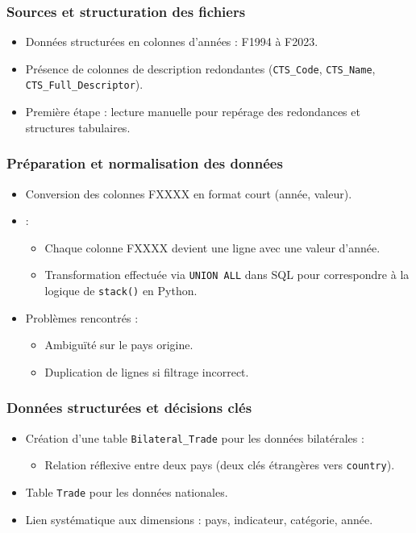 \documentclass[11pt]{beamer}
\begin{document}
\begin{frame}
  \frametitle{Sources et structuration des fichiers}
  \begin{itemize}
    \item<1-> Données structurées en colonnes d'années : F1994 à F2023.
    \item<2-> Présence de colonnes de description redondantes (\texttt{CTS\_Code}, \texttt{CTS\_Name}, \texttt{CTS\_Full\_Descriptor}).
    \item<3-> Première étape : lecture manuelle pour repérage des redondances et structures tabulaires.
  \end{itemize}
\end{frame}

\begin{frame}
  \frametitle{Préparation et normalisation des données}
  \begin{itemize}
    \item<1-> Conversion des colonnes FXXXX en format court (année, valeur).
    \item<2->  :
    \begin{itemize}
      \item Chaque colonne FXXXX devient une ligne avec une valeur d'année.
      \item Transformation effectuée via \texttt{UNION ALL} dans SQL pour correspondre à la logique de \texttt{stack()} en Python.
    \end{itemize}
    \item<3-> Problèmes rencontrés :
    \begin{itemize}
      \item Ambiguïté sur le pays origine.
      \item Duplication de lignes si filtrage incorrect.
    \end{itemize}
  \end{itemize}
\end{frame}

\begin{frame}
  \frametitle{Données structurées et décisions clés}
  \begin{itemize}
    \item<1-> Création d'une table \texttt{Bilateral\_Trade} pour les données bilatérales :
    \begin{itemize}
      \item Relation réflexive entre deux pays (deux clés étrangères vers \texttt{country}).
    \end{itemize}
    \item<2-> Table \texttt{Trade} pour les données nationales.
    \item<3-> Lien systématique aux dimensions : pays, indicateur, catégorie, année.
  \end{itemize}
\end{frame}
\end{document}
